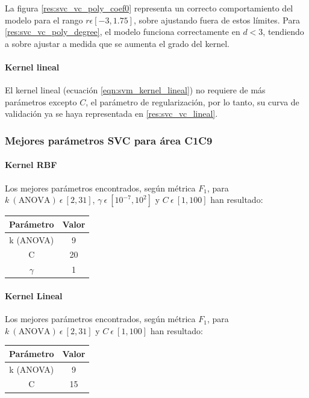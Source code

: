 La figura \ref{res:svc_vc_poly_coef0} representa un correcto comportamiento del modelo para el rango $r\epsilon[-3,1.75]$, sobre ajustando fuera de estos límites. Para \ref{res:svc_vc_poly_degree}, el modelo funciona correctamente en $d<3$, tendiendo a sobre ajustar a medida que se aumenta el grado del kernel.

\paragraph{Kernel lineal}

El kernel lineal (ecuación \ref{eqn:svm_kernel_lineal}) no requiere de más parámetros excepto $C$, el parámetro de regularización, por lo tanto, su curva de validación ya se haya representada en \ref{res:svc_vc_lineal}.

\subsubsection{Mejores parámetros SVC para área C1C9}

\paragraph{Kernel RBF}

Los mejores parámetros encontrados, según métrica $F_{1}$, para $k\:(\mbox{ANOVA})\:\epsilon\:[2,31]$, $\gamma\:\epsilon\:[10^{-7},10^{2}]$ y $C\:\epsilon\:[1,100]$ han resultado:

\begin{table}[H]
	\begin{tabular}{|c|c|}
		\hline
		Parámetro & Valor \\ \hline
		k (ANOVA) & 9 \\ \hline
		C & 20\\ \hline
		$\gamma$ & 1\\ \hline
	\end{tabular}
\end{table}

\paragraph{Kernel Lineal}

Los mejores parámetros encontrados, según métrica $F_{1}$, para $k\:(\mbox{ANOVA})\:\epsilon\:[2,31]$ y $C\:\epsilon\:[1,100]$ han resultado:

\begin{table}[H]
	\begin{tabular}{|c|c|}
		\hline
		Parámetro & Valor \\ \hline
		k (ANOVA) & 9 \\ \hline
		C & 15\\ \hline
	\end{tabular}
\end{table}


